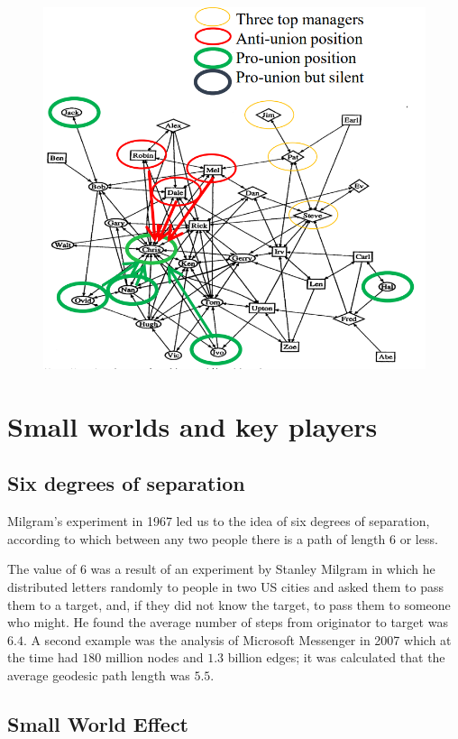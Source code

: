\documentclass[
  notitlepage,
  onecolumn,
  openany]{book}
\begin{document}
\begin{figure}[h!]

{\centering \includegraphics[width=0.5\linewidth]{images/07-Triads and structural holes/Untitled 3} 

}

\end{figure}

\hypertarget{small-worlds-and-key-players}{%
\section{Small worlds and key players}\label{small-worlds-and-key-players}}

\hypertarget{six-degrees-of-separation}{%
\subsection{Six degrees of separation}\label{six-degrees-of-separation}}

Milgram's experiment in 1967 led us to the idea of six degrees of separation, according to which between any two people there is a path of length \(6\) or less.

The value of \(6\) was a result of an experiment by Stanley Milgram in which he distributed letters randomly to people in two US cities and asked them to pass them to a target, and, if they did not know the target, to pass them to someone who might. He found the average number of steps from originator to target was \(6.4\). A second example was the analysis of Microsoft Messenger in 2007 which at the time had \(180\) million nodes and \(1.3\) billion edges; it was calculated that the average geodesic path length was \(5.5\).

\hypertarget{small-world-effect}{%
\subsection{Small World Effect}\label{small-world-effect}}
\end{document}
